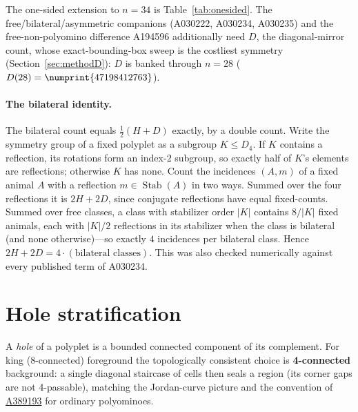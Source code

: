 \documentclass[11pt]{article}
\newcommand{\num}[1]{\numprint{#1}}
\begin{document}
The one-sided extension to $n=34$ is Table~\ref{tab:onesided}. The
free/bilateral/asymmetric companions (A030222, A030234, A030235) and the
free-non-polyomino difference A194596 additionally need $D$, the
diagonal-mirror count, whose exact-bounding-box sweep is the costliest
symmetry (Section~\ref{sec:methodD}): $D$ is banked through $n=28$
($D(28)=\num{47198412763}$).

\paragraph{The bilateral identity.}
The bilateral count equals $\tfrac12(H+D)$ exactly, by a double count. Write
the symmetry group of a fixed polyplet as a subgroup $K\le D_4$. If $K$
contains a reflection, its rotations form an index-$2$ subgroup, so exactly
half of $K$'s elements are reflections; otherwise $K$ has none. Count the
incidences $(A,m)$ of a fixed animal $A$ with a reflection
$m\in\operatorname{Stab}(A)$ in two ways. Summed over the four reflections it
is $2H+2D$, since conjugate reflections have equal fixed-counts. Summed over
free classes, a class with stabilizer order $|K|$ contains $8/|K|$ fixed
animals, each with $|K|/2$ reflections in its stabilizer when the class is
bilateral (and none otherwise)---so exactly $4$ incidences per bilateral
class. Hence $2H+2D=4\cdot(\text{bilateral classes})$. This was also checked
numerically against every published term of A030234.

\section{Hole stratification}
\label{sec:holes}

A \emph{hole} of a polyplet is a bounded connected component of its
complement. For king (8-connected) foreground the topologically consistent
choice is \textbf{4-connected} background: a single diagonal staircase of
cells then seals a region (its corner gaps are not 4-passable), matching the
Jordan-curve picture and the convention of
\href{https://oeis.org/A389193}{A389193} for ordinary polyominoes.
\end{document}
